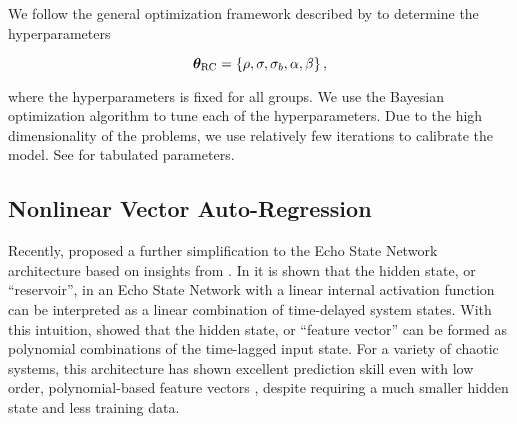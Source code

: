 We follow the general optimization framework described by
\citet{platt_systematic_2022} to determine the hyperparameters
\begin{linenomath*}\begin{equation}
    \bm{\theta}_\text{RC} =
    \{ \rho, \sigma, \sigma_{b}, \alpha, \beta \} \,
    ,
    \label{eq:rc-hyperparameters}
\end{equation}\end{linenomath*}
where the hyperparameters is fixed for all groups.
We use the Bayesian optimization algorithm 
to tune each of the hyperparameters.
Due to the high dimensionality of the problems, we use relatively few iterations
to calibrate the model.
See  for tabulated parameters.

\subsection{Nonlinear Vector Auto-Regression}
\label{subsec:nvar}

Recently, \citet{gauthier_next_2021} proposed a further simplification to the
Echo State Network architecture
based on insights from \citet{bollt_explaining_2021}.
In \citet{bollt_explaining_2021} it is shown that the hidden state, or
``reservoir'', in an Echo State Network with a linear internal activation
function can be interpreted as a linear combination
of time-delayed system states.
With this intuition, \citet{gauthier_next_2021} showed that the hidden state, or
``feature vector'' can be formed as polynomial combinations of the
time-lagged input state.
For a variety of chaotic systems, this architecture has shown excellent prediction skill
even with low order, polynomial-based feature vectors
\citep{chen_next_2022,barbosa_learning_2022,gauthier_next_2021}, despite requiring a much
smaller hidden state and less training data.


